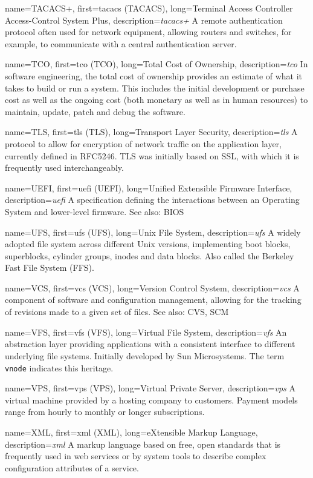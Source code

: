 {
	name={TACACS+},
	first={\acrlong{tacacs} (TACACS)},
	long={Terminal Access Controller Access-Control System Plus},
	description={{\em \acrlong{tacacs+}} A remote authentication protocol often used for network equipment,
allowing routers and switches, for example, to communicate with a central
authentication server.}
}

{
	name={TCO},
	first={\acrlong{tco} (TCO)},
	long={Total Cost of Ownership},
	description={{\em \acrlong{tco}} In software engineering, the total
cost of ownership provides an estimate of what it takes to build or run a
system.  This includes the initial development or purchase cost as well as
the ongoing cost (both monetary as well as in human resources) to
maintain, update, patch and debug the software.}
}

{
	name={TLS},
	first={\acrlong{tls} (TLS)},
	long={Transport Layer Security},
	description={{\em \acrlong{tls}} A protocol to allow for
encryption of network traffic on the application layer, currently defined
in RFC5246.  TLS was initially based on SSL, with which it is frequently
used interchangeably.}
}

{
	name={UEFI},
	first={\acrlong{uefi} (UEFI)},
	long={Unified Extensible Firmware Interface},
	description={{\em \acrlong{uefi}} A specification
defining the interactions between an Operating System and lower-level
firmware.  See also: BIOS}
}

{
	name={UFS},
	first={\acrlong{ufs} (UFS)},
	long={Unix File System},
	description={{\em \acrlong{ufs}} A widely adopted file system across
different Unix versions, implementing boot blocks, superblocks, cylinder
groups, inodes and data blocks.  Also called the Berkeley Fast File System
(FFS).}
}

{
	name={VCS},
	first={\acrlong{vcs} (VCS)},
	long={Version Control System},
	description={{\em \acrlong{vcs}} A
component of software and configuration management,
allowing for the tracking of revisions made to a given
set of files.  See also: CVS, SCM}
}

{
	name={VFS},
	first={\acrlong{vfs} (VFS)},
	long={Virtual File System},
	description={{\em \acrlong{vfs}} An abstraction layer providing
applications with a consistent interface to different underlying
file systems.  Initially developed by Sun Microsystems.  The term {\tt
vnode} indicates this heritage.}
}

{
	name={VPS},
	first={\acrlong{vps} (VPS)},
	long={Virtual Private Server},
	description={{\em \acrlong{vps}} A virtual machine provided by a
hosting company to customers.  Payment models range from hourly to monthly
or longer subscriptions.}
}

{
	name={XML},
	first={\acrlong{xml} (XML)},
	long={eXtensible Markup Language},
	description={{\em \acrlong{xml}} A markup
language based on free, open standards that is frequently
used in web services or by system tools to
describe complex configuration attributes of a
service.}
}
